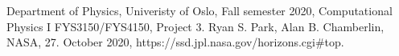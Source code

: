 \documentclass[reprint, english,notitlepage,nofootinbib]{revtex4-1}  %
\begin{document}
\onecolumngrid
\vspace{1cm} %
\newpage

\begin{thebibliography}{}
 Department of Physics, Univeristy of Oslo, Fall semester 2020, Computational Physics I FYS3150/FYS4150, Project 3.
 Ryan S. Park, Alan B. Chamberlin, NASA, 27. October 2020, https://ssd.jpl.nasa.gov/horizons.cgi\#top.

\end{thebibliography}
\end{document}
